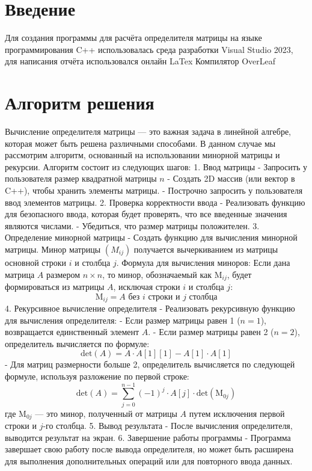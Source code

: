 \documentclass[14pt,a4paper]{scrartcl}
\begin{document}
\section{Введение}
Для создания программы для расчёта определителя матрицы на языке программирования C++ использовалась среда разработки Visual Studio 2023, для написания отчёта использовался онлайн LaTex Компилятор OverLeaf
\newpage
\section{Алгоритм решения}
Вычисление определителя матрицы — это важная задача в линейной алгебре, которая может быть решена различными способами. В данном случае мы рассмотрим алгоритм, основанный на использовании минорной матрицы и рекурсии. Алгоритм состоит из следующих шагов:
1. Ввод матрицы
- Запросить у пользователя размер квадратной матрицы $n$
- Создать 2D массив (или вектор в C++), чтобы хранить элементы матрицы.
- Построчно запросить у пользователя ввод элементов матрицы.
 2. Проверка корректности ввода
- Реализовать функцию для безопасного ввода, которая будет проверять, что все введенные значения являются числами.
- Убедиться, что размер матрицы положителен.
 3. Определение минорной матрицы
- Создать функцию для вычисления минорной матрицы. Минор матрицы $(M_{ij})$ получается вычеркиванием из матрицы основной строки $ i $ и столбца $ j $.
 Формула для вычисления миноров:
Если дана матрица $ A $ размером $ n \times n $, то минор, обозначаемый как $ \text{M}_{ij} $, будет формироваться из матрицы $ A $, исключая строки $ i $ и столбца $ j $:
$$
\text{M}_{ij} = A \text{ без } i \text{ строки и } j \text{ столбца}
$$
 4. Рекурсивное вычисление определителя
- Реализовать рекурсивную функцию для вычисления определителя:
  - Если размер матрицы равен 1 ($ n = 1 $), возвращается единственный элемент $ A $.
  - Если размер матрицы равен 2 ($ n = 2 $), определитель вычисляется по формуле:
$$
\text{det}(A) = A \cdot A[1][1] - A[1] \cdot A[1]
$$
  - Для матриц размерности больше 2, определитель вычисляется по следующей формуле, используя разложение по первой строке:
$$
\text{det}(A) = \sum_{j=0}^{n-1} (-1)^j \cdot A[j] \cdot \text{det}(\text{M}_{0j})
$$
где $ \text{M}_{0j} $ — это минор, полученный от матрицы $ A $ путем исключения первой строки и $ j $-го столбца.
 5. Вывод результата
- После вычисления определителя, выводится результат на экран.
 6. Завершение работы программы
- Программа завершает свою работу после вывода определителя, но может быть расширена для выполнения дополнительных операций или для повторного ввода данных.
\end{document}
